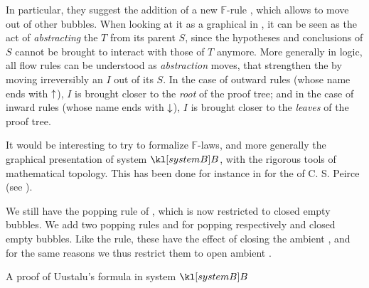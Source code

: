 \begin{description}
  In particular, they suggest the addition of a new $\mathbb{F}$-rule
  , which allows to move   out of other 
  bubbles. When looking at it as a graphical  in
  , it can be seen as the act of \emph{abstracting} the
   $T$ from its parent  $S$, since the hypotheses and conclusions
  of $S$ cannot be brought to interact with those of $T$ anymore. More generally
  in  logic, all flow rules can be understood as
  \emph{abstraction} moves, that strengthen the  by moving irreversibly an
   $I$ out of its  $S$. In the case of outward rules (whose name ends
  with $\uparrow$), $I$ is brought closer to the \emph{root} of the proof tree;
  and in the case of inward rules (whose name ends with $\downarrow$), $I$ is
  brought closer to the \emph{leaves} of the proof tree.
  
  It would be interesting to try to formalize $\mathbb{F}$-laws, and more
  generally the graphical presentation of system $\sysB$, with the rigorous
  tools of mathematical topology. This has been done for instance in
   for the  of C. S.
  Peirce (see ).

  \item[\textbf{\membrane}] 
  We still have the popping rule  of , which is now restricted to
  closed empty bubbles. We add two popping rules  and  for
  popping respectively  and  closed empty bubbles. Like the
   rule, these have the effect of closing the ambient
  , and for the same reasons we thus restrict them to open ambient
  .

  \begin{marginfigure}
    
    \caption{A proof of Uustalu's formula in system $\sysB$}
  \end{marginfigure}


\end{description}
